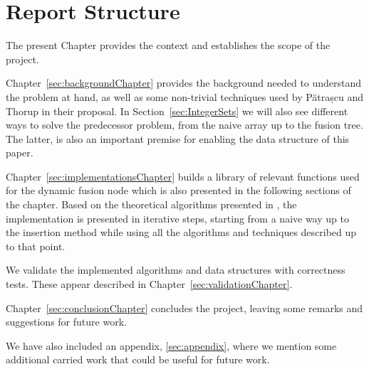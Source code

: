 \section{Report Structure}

The present Chapter provides the context and establishes the scope of the project.

Chapter~\ref{sec:backgroundChapter} provides the background needed to understand the problem at hand, as well as some non-trivial techniques used by Pătrașcu and Thorup in their proposal.
In Section~\ref{sec:IntegerSets} we will also see different ways to solve the predecessor problem, from the naive array up to the fusion tree. The latter, is also an important premise for enabling the data structure of this paper.

Chapter~\ref{sec:implementationsChapter} builds a library of relevant functions used for the dynamic fusion node which is also presented in the following sections of the chapter.
Based on the theoretical algorithms presented in \cite{patrascu2014dynamic}, the implementation is presented in iterative steps, starting from a naive way up to the insertion method while using all the algorithms and techniques described up to that point.

We validate the implemented algorithms and data structures with correctness tests. These appear described in Chapter~\ref{sec:validationChapter}.

Chapter~\ref{sec:conclusionChapter} concludes the project, leaving some remarks and suggestions for future work.

We have also included an appendix, \ref{sec:appendix}, where we mention some additional carried work that could be useful for future work.